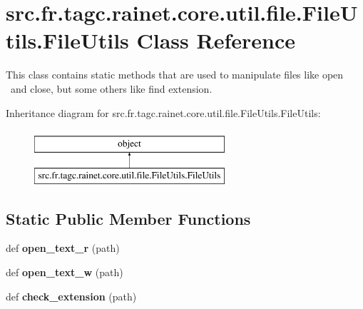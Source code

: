 \hypertarget{classsrc_1_1fr_1_1tagc_1_1rainet_1_1core_1_1util_1_1file_1_1FileUtils_1_1FileUtils}{}\section{src.\+fr.\+tagc.\+rainet.\+core.\+util.\+file.\+File\+Utils.\+File\+Utils Class Reference}
\label{classsrc_1_1fr_1_1tagc_1_1rainet_1_1core_1_1util_1_1file_1_1FileUtils_1_1FileUtils}


This class contains static methods that are used to manipulate files like open  and close, but some others like find extension.  


Inheritance diagram for src.\+fr.\+tagc.\+rainet.\+core.\+util.\+file.\+File\+Utils.\+File\+Utils\+:\begin{figure}[H]
\begin{center}
\leavevmode
\includegraphics[height=2.000000cm]{classsrc_1_1fr_1_1tagc_1_1rainet_1_1core_1_1util_1_1file_1_1FileUtils_1_1FileUtils}
\end{center}
\end{figure}
\subsection*{Static Public Member Functions}
\begin{DoxyCompactItemize}
\item 
\hypertarget{classsrc_1_1fr_1_1tagc_1_1rainet_1_1core_1_1util_1_1file_1_1FileUtils_1_1FileUtils_a1ad81b043ababe6f08c5af6eb7a31641}{}def {\bfseries open\+\_\+text\+\_\+r} (path)\label{classsrc_1_1fr_1_1tagc_1_1rainet_1_1core_1_1util_1_1file_1_1FileUtils_1_1FileUtils_a1ad81b043ababe6f08c5af6eb7a31641}

\item 
\hypertarget{classsrc_1_1fr_1_1tagc_1_1rainet_1_1core_1_1util_1_1file_1_1FileUtils_1_1FileUtils_ac5142dd1a95af1d3ec203aa341492dd4}{}def {\bfseries open\+\_\+text\+\_\+w} (path)\label{classsrc_1_1fr_1_1tagc_1_1rainet_1_1core_1_1util_1_1file_1_1FileUtils_1_1FileUtils_ac5142dd1a95af1d3ec203aa341492dd4}

\item 
\hypertarget{classsrc_1_1fr_1_1tagc_1_1rainet_1_1core_1_1util_1_1file_1_1FileUtils_1_1FileUtils_abccf9b5e787cb9762babba235810b432}{}def {\bfseries check\+\_\+extension} (path)\label{classsrc_1_1fr_1_1tagc_1_1rainet_1_1core_1_1util_1_1file_1_1FileUtils_1_1FileUtils_abccf9b5e787cb9762babba235810b432}

\end{DoxyCompactItemize}


